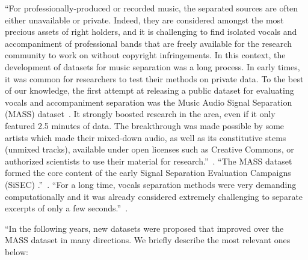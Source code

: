 ``For professionally-produced or recorded music, the separated sources are often either unavailable or private. Indeed, they are considered amongst the most precious assets of right holders, and it is challenging to find isolated vocals and accompaniment of professional bands that are freely available for the research community to work on without copyright infringements.
In this context, the development of datasets for music separation was a long process. 
In early times, it was common for researchers to test their methods on private data. 
To the best of our knowledge, the first attempt at releasing a public dataset for evaluating vocals and accompaniment separation was the Music Audio Signal Separation (MASS) dataset~\cite{MTGMASSdb}.
It strongly boosted research in the area, even if it only featured 2.5 minutes of data. The breakthrough was made possible by some artists which made their mixed-down audio, as well as its constitutive stems (unmixed tracks), available under open licenses such as Creative Commons, or authorized scientists to use their material for research.''~\cite{rafii}.
% 
``The MASS dataset formed the core content of the early Signal Separation Evaluation Campaigns (SiSEC) \cite{vincent09}.''~\cite{rafii}.
``For a long time, vocals separation methods were very demanding computationally and it was already considered extremely challenging to separate excerpts of only a few seconds.''~\cite{rafii}.

``In the following years, new datasets were proposed that improved over the MASS dataset in many directions. 
We briefly describe the most relevant ones below:

